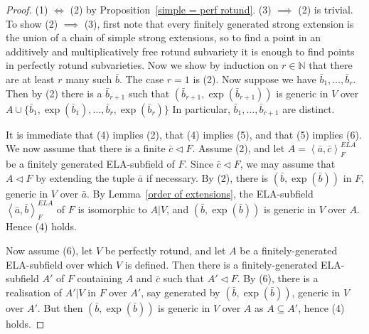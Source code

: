 \documentclass[12pt]{amsart}
\theoremstyle{definition}
\begin{document}
\begin{proof}
  (1) $\iff$ (2) by Proposition~\ref{simple = perf rotund}. (3)
     $\implies$ (2) is trivial. To show (2) $\implies$ (3), first note
     that every finitely generated strong extension is the union of a
     chain of simple strong extensions, so to find a point in an
     additively and multiplicatively free rotund subvariety it is
     enough to find points in perfectly rotund subvarieties. Now we
     show by induction on $r \in {\ensuremath{\mathbb{N}}}$ that there are at least $r$ many
     such ${{\ensuremath{\bar{b}}}}$. The case $r=1$ is (2). Now suppose we have
     ${{\ensuremath{\bar{b}}}}_1,\ldots,{{\ensuremath{\bar{b}}}}_r$. Then by (2) there is a ${{\ensuremath{\bar{b}}}}_{r+1}$
     such that $({{\ensuremath{\bar{b}}}}_{r+1},\exp({{\ensuremath{\bar{b}}}}_{r+1}))$ is generic in $V$
     over $A \cup
     \{{{\ensuremath{\bar{b}}}}_1,\exp({{\ensuremath{\bar{b}}}}_1),\ldots,{{\ensuremath{\bar{b}}}}_r,\exp({{\ensuremath{\bar{b}}}}_r)\}$ In
     particular, ${{\ensuremath{\bar{b}}}}_1,\ldots,{{\ensuremath{\bar{b}}}}_{r+1}$ are distinct.

It is immediate that (4) implies (2), that (4) implies (5), and that (5) implies (6). We now assume that there is a finite ${{\ensuremath{\bar{c}}}} {\ensuremath{\lhd}} F$. Assume (2), and let $A = {\ensuremath{\left\langle {{{\ensuremath{\bar{a}}}},{{\ensuremath{\bar{c}}}}} \right\rangle}}_F^{ELA}$ be a finitely generated ELA-subfield of $F$. Since ${{\ensuremath{\bar{c}}}} {\ensuremath{\lhd}} F$, we may assume that $A {\ensuremath{\lhd}} F$ by extending the tuple ${{\ensuremath{\bar{a}}}}$ if necessary. By (2), there is $({{\ensuremath{\bar{b}}}},\exp({{\ensuremath{\bar{b}}}}))$ in $F$, generic in $V$ over ${{\ensuremath{\bar{a}}}}$. By Lemma~\ref{order of extensions}, the ELA-subfield ${\ensuremath{\left\langle {{{\ensuremath{\bar{a}}}},{{\ensuremath{\bar{b}}}}} \right\rangle}}^{ELA}_F$ of $F$ is isomorphic to $A|V$, and $({{\ensuremath{\bar{b}}}},\exp({{\ensuremath{\bar{b}}}}))$ is generic in $V$ over $A$. Hence (4) holds.

Now assume (6), let $V$ be perfectly rotund, and let $A$ be a finitely-generated ELA-subfield over which $V$ is defined. Then there is a finitely-generated ELA-subfield $A'$ of $F$ containing $A$ and ${{\ensuremath{\bar{c}}}}$ such that $A' {\ensuremath{\lhd}} F$. By (6), there is a realisation of $A'|V$ in $F$ over $A'$, say generated by $({{\ensuremath{\bar{b}}}},\exp({{\ensuremath{\bar{b}}}}))$, generic in $V$ over $A'$. But then $({{\ensuremath{\bar{b}}}},\exp({{\ensuremath{\bar{b}}}}))$ is generic in $V$ over $A$ as $A {\subseteq} A'$, hence (4) holds.
\end{proof}
\end{document}
